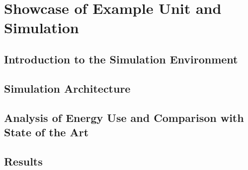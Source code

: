 \chapter{Showcase of Example Unit and Simulation}
\label{chap:simulation}
%
\section{Introduction to the Simulation Environment}
\section{Simulation Architecture}
\section{Analysis of Energy Use and Comparison with State of the Art}
\section{Results}

